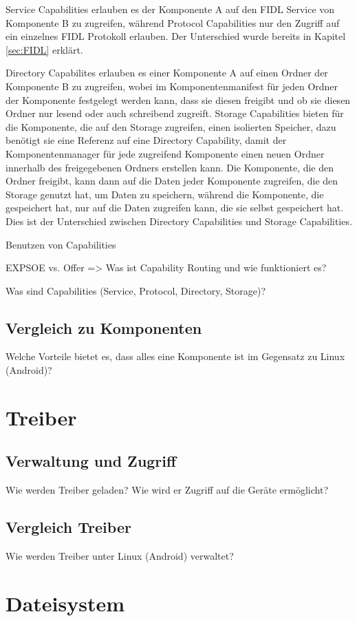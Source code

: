 \documentclass[a4paper]{scrartcl}
\begin{document}
Service Capabilities erlauben es der Komponente A auf den FIDL Service von Komponente B zu zugreifen, während Protocol Capabilities nur den Zugriff auf ein einzelnes FIDL Protokoll erlauben. Der Unterschied wurde bereits in Kapitel \ref{sec:FIDL} erklärt.

Directory Capabilites erlauben es einer Komponente A auf einen Ordner der Komponente B zu zugreifen, wobei im Komponentenmanifest für jeden Ordner der Komponente festgelegt werden kann, dass sie diesen freigibt und ob sie diesen Ordner nur lesend oder auch schreibend zugreift. Storage Capabilities bieten für die Komponente, die auf den Storage zugreifen, einen isolierten Speicher, dazu benötigt sie eine Referenz auf eine Directory Capability, damit der Komponentenmanager für jede zugreifend Komponente einen neuen Ordner innerhalb des freigegebenen Ordners erstellen kann. Die Komponente, die den Ordner freigibt, kann dann auf die Daten jeder Komponente zugreifen, die den Storage genutzt hat, um Daten zu speichern, während die Komponente, die gespeichert hat, nur auf die Daten zugreifen kann, die sie selbst gespeichert hat. Dies ist der Unterschied zwischen Directory Capabilities und Storage Capabilities.

Benutzen von Capabilities 

EXPSOE vs. Offer => Was ist Capability Routing und wie funktioniert es?

Was sind Capabilities (Service, Protocol, Directory, Storage)?
\subsection{Vergleich zu Komponenten}
Welche Vorteile bietet es, dass alles eine Komponente ist im Gegensatz zu Linux (Android)?
\section{Treiber}
\subsection{Verwaltung und Zugriff}
Wie werden Treiber geladen?
Wie wird er Zugriff auf die Geräte ermöglicht?
\subsection{Vergleich Treiber}
Wie werden Treiber unter Linux (Android) verwaltet?
\section{Dateisystem}
\label{sec:Dateisystem}
\end{document}
